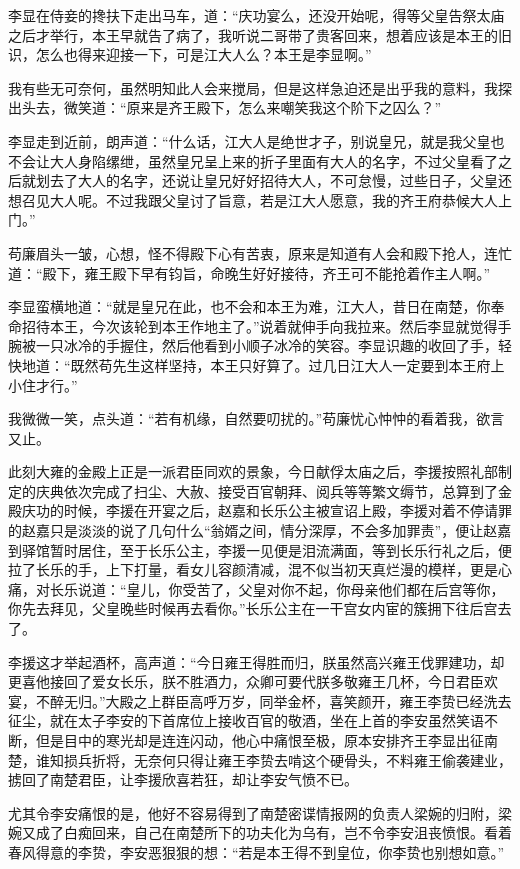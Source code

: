 李显在侍妾的搀扶下走出马车，道：“庆功宴么，还没开始呢，得等父皇告祭太庙之后才举行，本王早就告了病了，我听说二哥带了贵客回来，想着应该是本王的旧识，怎么也得来迎接一下，可是江大人么？本王是李显啊。”

我有些无可奈何，虽然明知此人会来搅局，但是这样急迫还是出乎我的意料，我探出头去，微笑道：“原来是齐王殿下，怎么来嘲笑我这个阶下之囚么？”

李显走到近前，朗声道：“什么话，江大人是绝世才子，别说皇兄，就是我父皇也不会让大人身陷缧绁，虽然皇兄呈上来的折子里面有大人的名字，不过父皇看了之后就划去了大人的名字，还说让皇兄好好招待大人，不可怠慢，过些日子，父皇还想召见大人呢。不过我跟父皇讨了旨意，若是江大人愿意，我的齐王府恭候大人上门。”

苟廉眉头一皱，心想，怪不得殿下心有苦衷，原来是知道有人会和殿下抢人，连忙道：“殿下，雍王殿下早有钧旨，命晚生好好接待，齐王可不能抢着作主人啊。”

李显蛮横地道：“就是皇兄在此，也不会和本王为难，江大人，昔日在南楚，你奉命招待本王，今次该轮到本王作地主了。”说着就伸手向我拉来。然后李显就觉得手腕被一只冰冷的手握住，然后他看到小顺子冰冷的笑容。李显识趣的收回了手，轻快地道：“既然苟先生这样坚持，本王只好算了。过几日江大人一定要到本王府上小住才行。”

我微微一笑，点头道：“若有机缘，自然要叨扰的。”苟廉忧心忡忡的看着我，欲言又止。

此刻大雍的金殿上正是一派君臣同欢的景象，今日献俘太庙之后，李援按照礼部制定的庆典依次完成了扫尘、大赦、接受百官朝拜、阅兵等等繁文缛节，总算到了金殿庆功的时候，李援在开宴之后，赵嘉和长乐公主被宣诏上殿，李援对着不停请罪的赵嘉只是淡淡的说了几句什么“翁婿之间，情分深厚，不会多加罪责”，便让赵嘉到驿馆暂时居住，至于长乐公主，李援一见便是泪流满面，等到长乐行礼之后，便拉了长乐的手，上下打量，看女儿容颜清减，混不似当初天真烂漫的模样，更是心痛，对长乐说道：“皇儿，你受苦了，父皇对你不起，你母亲他们都在后宫等你，你先去拜见，父皇晚些时候再去看你。”长乐公主在一干宫女内宦的簇拥下往后宫去了。

李援这才举起酒杯，高声道：“今日雍王得胜而归，朕虽然高兴雍王伐罪建功，却更喜他接回了爱女长乐，朕不胜酒力，众卿可要代朕多敬雍王几杯，今日君臣欢宴，不醉无归。”大殿之上群臣高呼万岁，同举金杯，喜笑颜开，雍王李贽已经洗去征尘，就在太子李安的下首席位上接收百官的敬酒，坐在上首的李安虽然笑语不断，但是目中的寒光却是连连闪动，他心中痛恨至极，原本安排齐王李显出征南楚，谁知损兵折将，无奈何只得让雍王李贽去啃这个硬骨头，不料雍王偷袭建业，掳回了南楚君臣，让李援欣喜若狂，却让李安气愤不已。

尤其令李安痛恨的是，他好不容易得到了南楚密谍情报网的负责人梁婉的归附，梁婉又成了白痴回来，自己在南楚所下的功夫化为乌有，岂不令李安沮丧愤恨。看着春风得意的李贽，李安恶狠狠的想：“若是本王得不到皇位，你李贽也别想如意。”

